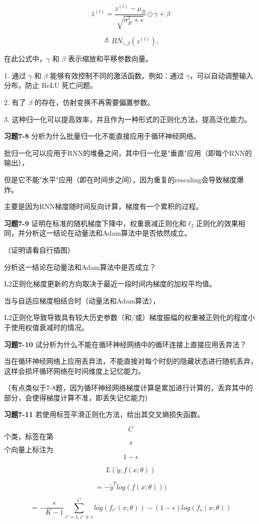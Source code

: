 \[
\hat{z}^{(l)} = \frac{z^{(l)} - \mu_B}{\sqrt{\sigma_B^2 + \epsilon}} \odot \gamma + \beta
\]

\[
\triangleq BN_{\gamma,\beta}(z^{(l)}),
\]

在此公式中，$\gamma$ 和 $\beta$ 表示缩放和平移参数向量。

1. 通过 $\gamma$ 和 $\beta$ 能够有效控制不同的激活函数。例如：通过 $\gamma$，可以自动调整输入分布，防止 ReLU 死亡问题。

2. 有了 $\beta$ 的存在，仿射变换不再需要偏置参数。

3. 这种归一化可以提高效率，并且作为一种形式的正则化方法，提高泛化能力。

\noindent\textbf{习题7-8} 分析为什么批量归一化不能直接应用于循环神经网络。

批归一化可以应用于RNN的堆叠之间，其中归一化是"垂直"应用（即每个RNN的输出），

但是它不能"水平"应用（即在时间步之间），因为重复的rescaling会导致梯度爆炸。

主要是因为RNN梯度随时间反向计算，梯度有一个累积的过程。

\noindent\textbf{习题7-9} 证明在标准的随机梯度下降中，权重衰减正则化和$\ell_2$正则化的效果相同，并分析这一结论在动量法和Adam算法中是否依然成立。

（证明请看自行插图）

分析这一结论在动量法和Adam算法中是否成立？

L2正则化梯度更新的方向取决于最近一段时间内梯度的加权平均值。

当与自适应梯度相结合时（动量法和Adam算法），

L2正则化导致导致具有较大历史参数（和/或）梯度振幅的权重被正则化的程度小于使用权值衰减时的情况。

\noindent\textbf{习题7-10} 试分析为什么不能在循环神经网络中的循环连接上直接应用丢弃法？

当在循环神经网络上应用丢弃法，不能直接对每个时刻的隐藏状态进行随机丢弃，这样会损坏循环网络在时间维度上记忆能力。

（有点类似于7-8题，因为循环神经网络梯度计算是累加进行计算的，丢弃其中的部分，会使得梯度计算不准，即丢失记忆能力）

\noindent\textbf{习题7-11} 若使用标签平滑正则化方法，给出其交叉熵损失函数。

$$C$$ 个类，标签在第 $$s$$ 个向量上标注为 $$1-\epsilon$$

\[
L(\tilde{y}, f(x;\theta))
\]

\[
=-\tilde{y}^T log(f(x;\theta)))
\]

\[
=-\frac{\epsilon}{K-1}\sum_{c'=1,c'\neq s}^C log(f_{c'}(x;\theta))-(1-\epsilon)log(f_s(x;\theta))
\]

